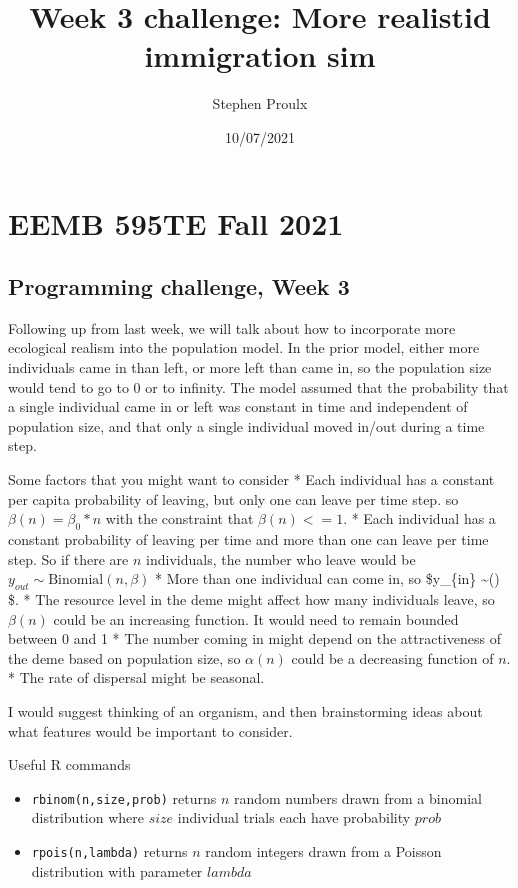 \documentclass[
]{article}
\title{Week 3 challenge: More realistid immigration sim}
\author{Stephen Proulx}
\date{10/07/2021}
\providecommand{\tightlist}{%
  \setlength{\itemsep}{0pt}\setlength{\parskip}{0pt}}
\begin{document}
\maketitle

\hypertarget{eemb-595te-fall-2021}{%
\section{EEMB 595TE Fall 2021}\label{eemb-595te-fall-2021}}

\hypertarget{programming-challenge-week-3}{%
\subsection{Programming challenge, Week
3}\label{programming-challenge-week-3}}

Following up from last week, we will talk about how to incorporate more
ecological realism into the population model. In the prior model, either
more individuals came in than left, or more left than came in, so the
population size would tend to go to 0 or to infinity. The model assumed
that the probability that a single individual came in or left was
constant in time and independent of population size, and that only a
single individual moved in/out during a time step.

Some factors that you might want to consider * Each individual has a
constant per capita probability of leaving, but only one can leave per
time step. so \(\beta(n) = \beta_0 * n\) with the constraint that
\(\beta(n) <= 1\). * Each individual has a constant probability of
leaving per time and more than one can leave per time step. So if there
are \(n\) individuals, the number who leave would be
\(y_{out} \sim \mathrm{Binomial}(n,\beta)\) * More than one individual
can come in, so \$y\_\{in\} \sim {}(\alpha) \$. * The
resource level in the deme might affect how many individuals leave, so
\(\beta(n)\) could be an increasing function. It would need to remain
bounded between 0 and 1 * The number coming in might depend on the
attractiveness of the deme based on population size, so \(\alpha(n)\)
could be a decreasing function of \(n\). * The rate of dispersal might
be seasonal.

I would suggest thinking of an organism, and then brainstorming ideas
about what features would be important to consider.

Useful R commands

\begin{itemize}
\tightlist
\item
  \texttt{rbinom(n,size,prob)} returns \(n\) random numbers drawn from a
  binomial distribution where \(size\) individual trials each have
  probability \(prob\)
\item
  \texttt{rpois(n,lambda)} returns \(n\) random integers drawn from a
  Poisson distribution with parameter \(lambda\)
\end{itemize}
\end{document}
